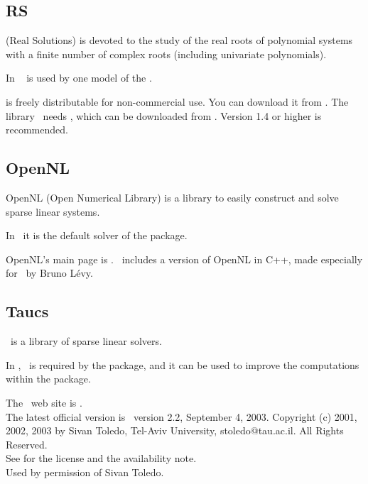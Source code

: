 \subsection{RS \label{thirdparty:RS}}

\rs{} (Real Solutions) is devoted to the study of the real
roots of polynomial systems with a finite number of complex roots
(including univariate polynomials). 

In \cgal\ \rs{} is used by one model of the .

\rs{} is freely distributable for non-commercial use. You can download it
from \rspage{}. The library \rs\ needs \mpfi, which can be downloaded from \mpfipage. 
Version 1.4 or higher is recommended.



\subsection{OpenNL \label{thirdparty:OpenNL}}

OpenNL (Open Numerical Library) is a library to easily construct and solve
sparse linear systems. 

In \cgal\ it is the default solver of the
 package.

OpenNL's main page is \opennlpage.
\cgal\ includes a version of OpenNL in C++, made especially for \cgal\ by Bruno L\'evy.



\subsection{Taucs \label{thirdparty:Taucs}}

\taucs\ is a library of sparse linear solvers.

In \cgal, \taucs\ is required by the 
package, and it can be
used to improve the computations within the
package.

The \taucs\ web site is \taucspage.\\
The latest official version is \taucs\ version 2.2, September 4, 2003.
Copyright (c) 2001, 2002, 2003 by Sivan Toledo, Tel-Aviv University,
stoledo@tau.ac.il. All Rights Reserved.\\
See \taucspage{} for the license and the availability note.\\
Used by permission of Sivan Toledo.

